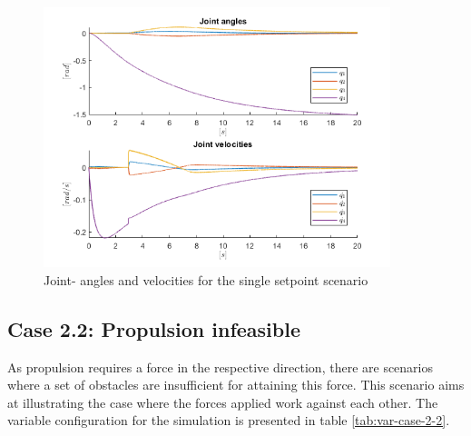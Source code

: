 \begin{figure}
    \centering
    \includegraphics[width=0.9\textwidth]{figures/case-2-1/case2-1-joint-og-vel.png}
    \caption{Joint- angles and velocities for the single setpoint scenario}
    \label{fig:case2-1-plot}
\end{figure}


\subsection{Case 2.2: Propulsion infeasible}

As propulsion requires a force in the respective direction, there are scenarios where a set of obstacles are insufficient for attaining this force. This scenario aims at illustrating the case where the forces applied work against each other. The variable configuration for the simulation is presented in table \ref{tab:var-case-2-2}.

